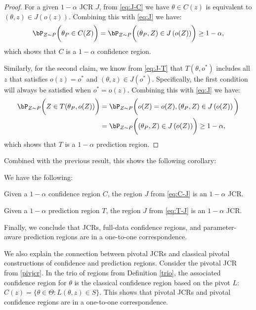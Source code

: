 \documentclass[english]{article}
\begin{document}
\begin{proof}
    For a given $1 - \alpha$ JCR $J$, from \eqref{eq:J-C} we have $\theta \in C(z)$ is equivalent to $(\theta,z) \in J(o(z))$. Combining this with \eqref{eq:J} we have:
    \begin{align*}
        \bP_{Z \sim P}\biggl(\theta_P \in C(Z)\biggr) = \bP_{Z \sim P}\biggl(\left(\theta_P, Z\right) \in J\left( o(Z)\right)\biggr) \ge 1 - \alpha,
    \end{align*}
    which shows that $C$ is a $1 - \alpha$ confidence region.
    
    Similarly, for the second claim, we know from \eqref{eq:J-T} that $T(\theta,o^*)$ includes all $z$ that satisfies $o(z) = o^*$ and $(\theta,z) \in J(o^*)$. Specifically, the first condition will always be satisfied when $o^* = o(z)$. Combining this with \eqref{eq:J} we have:
    \begin{align*}
        \bP_{Z \sim P}\biggl(Z\in T(\theta_P,o(Z))\biggr) &= 
        \bP_{Z \sim P}\biggl(o(Z) = o(Z),\left(\theta_P, Z\right) \in J\left( o(Z)\right)\biggl) \\
        &=\bP_{Z \sim P}\biggl(\left(\theta_P, Z\right) \in J\left( o(Z)\right)\biggr)
        \ge 1 - \alpha,
    \end{align*}
    which shows that $T$ is a $1 - \alpha$ prediction region.
\end{proof}
Combined with the previous result, this shows the following corollary:

\begin{corollary}\label{RC-J}
We have the following:
\benum
    \item Given a $1-\alpha$ confidence region $C$, the region  $J$ from \eqref{eq:C-J} is an $1-\alpha$ JCR.
    \item Given a $1-\alpha$ prediction region $T$, the region  $J$ from \eqref{eq:T-J} is an $1-\alpha$ JCR.
\eenum
\end{corollary}
Finally, we conclude that JCRs, full-data confidence regions, and parameter-aware prediction regions are in a one-to-one correspondence.

We also explain the connection between pivotal JCRs and classical pivotal constructions of confidence and prediction regions.
Consider the pivotal JCR from \eqref{pivjcr}.
In the trio of regions from Definition \eqref{trio}, the associated confidence region for $\theta$ is the classical confidence region based on the pivot $L$:
 $C(z) = \{\theta \in \Theta : L(\theta,z) \in S\}.$
This shows that pivotal JCRs and pivotal confidence regions are in a one-to-one correspondence.
\end{document}
